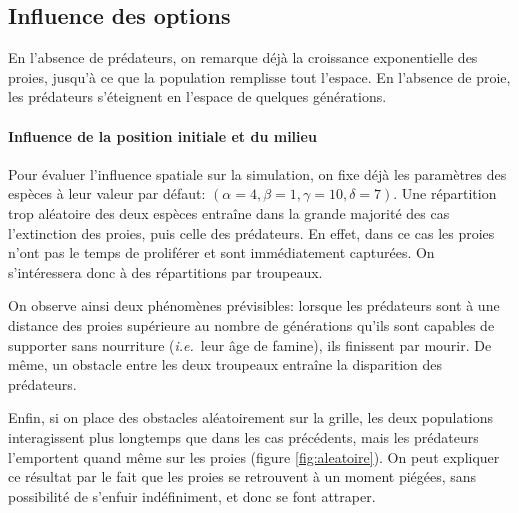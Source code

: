 \documentclass[11pt]{article}
\newcommand{\ie}{\textsl{i.e.}\ }
\begin{document}
\subsection{Influence des options}
En l'absence de prédateurs, on remarque déjà la croissance exponentielle des proies, jusqu'à ce que la population remplisse tout l'espace. En l'absence de proie, les prédateurs s'éteignent en l'espace de quelques générations.


\paragraph{Influence de la position initiale et du milieu}
Pour évaluer l'influence spatiale sur la simulation, on fixe déjà les paramètres des espèces à leur valeur par défaut: $(\alpha = 4, \beta = 1, \gamma = 10, \delta = 7)$.
Une répartition trop aléatoire des deux espèces entraîne dans la grande majorité des cas l'extinction des proies, puis celle des prédateurs. En effet, dans ce cas les proies n'ont pas le temps de proliférer et sont immédiatement capturées. On s'intéressera donc à des répartitions par troupeaux.

On observe ainsi deux phénomènes prévisibles: lorsque les prédateurs sont à une distance des proies supérieure au nombre de générations qu'ils sont capables de supporter sans nourriture (\ie leur âge de famine), ils finissent par mourir. De même, un obstacle entre les deux troupeaux entraîne la disparition des prédateurs.

Enfin, si on place des obstacles aléatoirement sur la grille, les deux populations interagissent plus longtemps que dans les cas précédents, mais les prédateurs l'emportent quand même sur les proies (figure \ref{fig:aleatoire}). On peut expliquer ce résultat par le fait que les proies se retrouvent à un moment piégées, sans possibilité de s'enfuir indéfiniment, et donc se font attraper.
\end{document}
